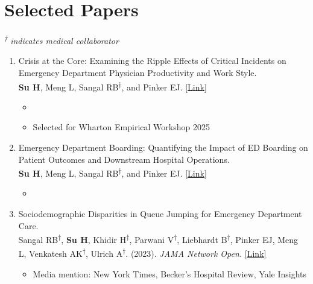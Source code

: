 \documentclass[letterpaper,11pt]{article}
\newif\ifpublic
\newcommand{\PrivatePaperStatusCi}{Resubmitted to \textit{Manufacturing \& Service Operations Management}}
\newcommand{\PrivatePaperStatusBoarding}{Reject \& Resubmit at \textit{Operations Research}}
\newcommand{\PublicPaperStatusCi}{Major Revision at \textit{Manufacturing \& Service Operations Management}}
\newcommand{\PublicPaperStatusBoarding}{Reject \& Resubmit at \textit{Operations Research}}
\newcommand{\PaperStatusCi}{\ifpublic\PublicPaperStatusCi\else\PrivatePaperStatusCi\fi}
\newcommand{\PaperStatusBoarding}{\ifpublic\PublicPaperStatusBoarding\else\PrivatePaperStatusBoarding\fi}
\begin{document}
\section{Selected Papers}
\begin{flushleft}
\vspace{-5pt}
\textit{\textsuperscript{†} indicates medical collaborator}
\end{flushleft}
\vspace{-20pt}

\begin{enumerate}
    
    \item Crisis at the Core: Examining the Ripple Effects of Critical Incidents on Emergency Department Physician Productivity and Work Style. \\\textbf{Su H}, Meng L, Sangal RB\textsuperscript{†}, and Pinker EJ. \href{https://papers.ssrn.com/sol3/papers.cfm?abstract_id=5113467}{\textcolor{linkblue}{[Link]}}
    \vspace{-8pt}
    \begin{itemize}
        \item \PaperStatusCi
        \vspace{-4pt}
        \item Selected for Wharton Empirical Workshop 2025
    \end{itemize}

    \vspace{-8pt}
    \item Emergency Department Boarding: Quantifying the Impact of ED Boarding on Patient Outcomes and Downstream Hospital Operations.\\\textbf{Su H}, Meng L, Sangal RB\textsuperscript{†}, and Pinker EJ. \href{https://papers.ssrn.com/sol3/papers.cfm?abstract_id=4693153}{\textcolor{linkblue}{[Link]}}
    \vspace{-8pt}
    \begin{itemize}
        \item \PaperStatusBoarding
    \end{itemize}
    
    \vspace{-8pt}
    \item Sociodemographic Disparities in Queue Jumping for Emergency Department Care. \\Sangal RB\textsuperscript{†}, \textbf{Su H}, Khidir H\textsuperscript{†}, Parwani V\textsuperscript{†}, Liebhardt B\textsuperscript{†}, Pinker EJ, Meng L, Venkatesh AK\textsuperscript{†}, Ulrich A\textsuperscript{†}. (2023). \textit{JAMA Network Open.} \href{https://jamanetwork.com/journals/jamanetworkopen/fullarticle/2807707}{\textcolor{linkblue}{[Link]}}
    \vspace{-8pt}
    \begin{itemize}
        \item Media mention: New York Times, Becker's Hospital Review, Yale Insights
    \end{itemize}
    \vspace{-8pt}
    

\end{enumerate}
\end{document}
